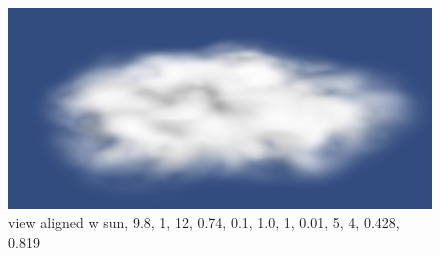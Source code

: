 \begin{figure}[h]
\centering
\includegraphics[width=\textwidth]{../res/res4.png}
\caption{view aligned w sun, 9.8, 1, 12, 0.74, 0.1, 1.0, 1, 0.01, 5, 4, 0.428, 0.819}
\end{figure}



